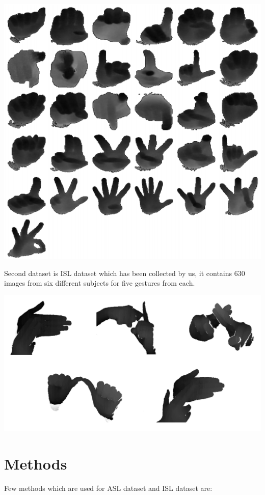 \documentclass[a0,landscape]{a0poster}
\begin{document}
\begin{multicols}{4}
\begin{center}\vspace{1cm}
\includegraphics[width=0.7\linewidth]{processed}
\end{center}\vspace{1cm}

Second dataset is ISL dataset which has been collected by us, it contains 630 images from six different subjects for five gestures from each.
\begin{center}\vspace{1cm}
\includegraphics[width=0.70\linewidth]{isl1}
\end{center}\vspace{1cm}

\section*{Methods}

Few methods which are used for ASL dataset and ISL dataset are:\\


\end{multicols}
\end{document}
